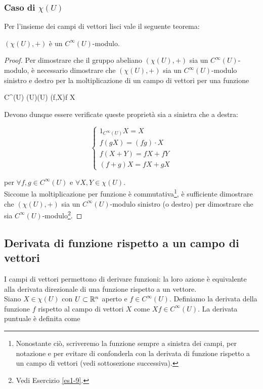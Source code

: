 \subsubsection{Caso di $ \chi(U) $}

Per l'insieme dei campi di vettori lisci vale il seguente teorema:

\begin{theorem}\label{chi-mod}
	$ (\chi(U),+) $ è un $ C^{\infty}(U) $-modulo.
\end{theorem}

\begin{proof}
	Per dimostrare che il gruppo abeliano $ (\chi(U),+) $ sia un $ C^{\infty}(U) $-modulo, è necessario dimostrare che $ (\chi(U),+) $ sia un $ C^{\infty}(U) $-modulo sinistro e destro per la moltiplicazione di un campo di vettori per una funzione
	
	\map{\cdot}
		{C^{\infty}(U) \times \chi(U)}{\chi(U)}
		{(f,X)}{f X}

	Devono dunque essere verificate queste proprietà sia a sinistra che a destra:

	\begin{equation}
		\begin{cases}
			1_{C^{\infty}(U)} X = X\\
			f (g X) = (f g) \cdot X\\
			f (X+Y) = f X + f Y\\
			(f+g) X = f X + g X
		\end{cases}
	\end{equation}

	per $ \forall f,g \in C^{\infty}(U) $ e $ \forall X,Y \in \chi(U) $.\\
	Siccome la moltiplicazione per funzione è commutativa\footnote{%
		Nonostante ciò, scriveremo la funzione sempre a sinistra dei campi, per notazione e per evitare di confonderla con la derivata di funzione rispetto a un campo di vettori (vedi sottosezione successiva).%
	}, è sufficiente dimostrare che $ (\chi(U),+) $ sia un $ C^{\infty}(U) $-modulo sinistro (o destro) per dimostrare che sia $ C^{\infty}(U) $-modulo\footnote{%
		Vedi Esercizio \ref{es1-9}.%
	}.
\end{proof}

\subsection{Derivata di funzione rispetto a un campo di vettori}

I campi di vettori permettono di derivare funzioni: la loro azione è equivalente alla derivata direzionale di una funzione rispetto a un vettore.\\
Siano $ X \in \chi(U) $ con $ U \subset \mathbb{R}^{n} $ aperto e $ f \in C^{\infty}(U) $. Definiamo la derivata della funzione $ f $ rispetto al campo di vettori $ X $ come $ X f \in C^{\infty}(U) $. La derivata puntuale è definita come

